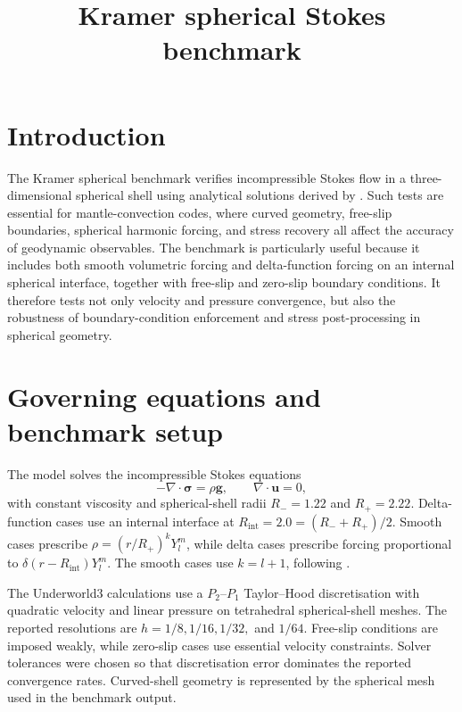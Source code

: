 \documentclass[11pt,a4paper]{article}
\title{Kramer spherical Stokes benchmark}
\author{}
\date{}
\begin{document}
\maketitle
\vspace{-2.0em}

\section{Introduction}

The Kramer spherical benchmark verifies incompressible Stokes flow in a three-dimensional spherical shell using analytical solutions derived by \citet{kramer2021}. Such tests are essential for mantle-convection codes, where curved geometry, free-slip boundaries, spherical harmonic forcing, and stress recovery all affect the accuracy of geodynamic observables. The benchmark is particularly useful because it includes both smooth volumetric forcing and delta-function forcing on an internal spherical interface, together with free-slip and zero-slip boundary conditions. It therefore tests not only velocity and pressure convergence, but also the robustness of boundary-condition enforcement and stress post-processing in spherical geometry.

\section{Governing equations and benchmark setup}

The model solves the incompressible Stokes equations
\[
  -\nabla \cdot \boldsymbol{\sigma} = \rho \mathbf{g},
  \qquad
  \nabla \cdot \mathbf{u}=0,
\]
with constant viscosity and spherical-shell radii \(R_-=1.22\) and \(R_+=2.22\). Delta-function cases use an internal interface at \(R_{\mathrm{int}}=2.0=(R_-+R_+)/2\). Smooth cases prescribe \(\rho=(r/R_+)^kY_l^m\), while delta cases prescribe forcing proportional to \(\delta(r-R_{\mathrm{int}})Y_l^m\). The smooth cases use \(k=l+1\), following \citet{kramer2021}.

The Underworld3 calculations use a \(P_2\)--\(P_1\) Taylor--Hood discretisation with quadratic velocity and linear pressure on tetrahedral spherical-shell meshes. The reported resolutions are \(h=1/8,1/16,1/32,\) and \(1/64\). Free-slip conditions are imposed weakly, while zero-slip cases use essential velocity constraints. Solver tolerances were chosen so that discretisation error dominates the reported convergence rates. Curved-shell geometry is represented by the spherical mesh used in the benchmark output.
\end{document}
